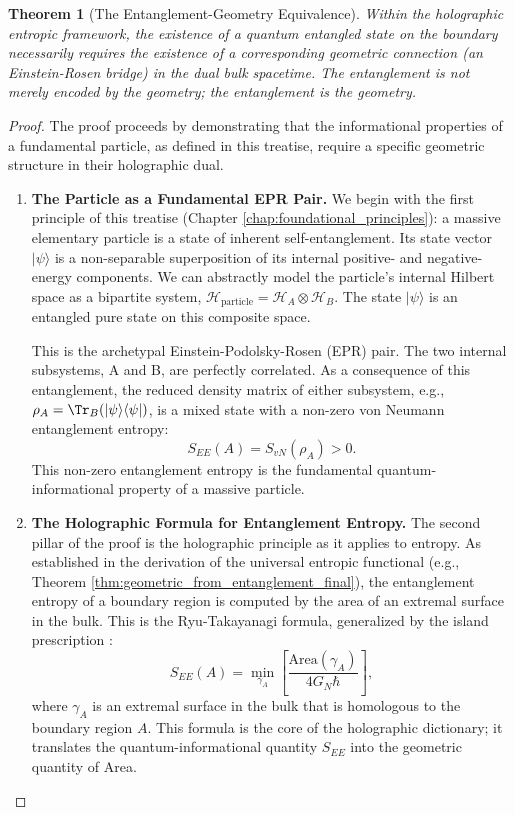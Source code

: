 \documentclass[11pt, letterpaper]{report}
\theoremstyle{plain} %
\newtheorem{theorem}{Theorem}[chapter]
\theoremstyle{definition} %
\theoremstyle{remark} %
\begin{document}
\begin{theorem}[The Entanglement-Geometry Equivalence]
\label{thm:er_epr_proof}
Within the holographic entropic framework, the existence of a quantum entangled state on the boundary necessarily requires the existence of a corresponding geometric connection (an Einstein-Rosen bridge) in the dual bulk spacetime. The entanglement is not merely encoded by the geometry; the entanglement \textit{is} the geometry.
\end{theorem}
\begin{proof}
The proof proceeds by demonstrating that the informational properties of a fundamental particle, as defined in this treatise, require a specific geometric structure in their holographic dual.

\begin{enumerate}
    \item \textbf{The Particle as a Fundamental EPR Pair.}
    We begin with the first principle of this treatise (Chapter \ref{chap:foundational_principles}): a massive elementary particle is a state of inherent self-entanglement. Its state vector $|\psi\rangle$ is a non-separable superposition of its internal positive- and negative-energy components. We can abstractly model the particle's internal Hilbert space as a bipartite system, $\mathcal{H}_{\text{particle}} = \mathcal{H}_A \otimes \mathcal{H}_B$. The state $|\psi\rangle$ is an entangled pure state on this composite space.
    
    This is the archetypal Einstein-Podolsky-Rosen (EPR) pair. The two internal subsystems, A and B, are perfectly correlated. As a consequence of this entanglement, the reduced density matrix of either subsystem, e.g., $\rho_A = \Tr_B(|\psi\rangle\langle\psi|)$, is a mixed state with a non-zero von Neumann entanglement entropy:
    \begin{equation}
        S_{EE}(A) = S_{vN}(\rho_A) > 0.
    \end{equation}
    This non-zero entanglement entropy is the fundamental quantum-informational property of a massive particle.

    \item \textbf{The Holographic Formula for Entanglement Entropy.}
    The second pillar of the proof is the holographic principle as it applies to entropy. As established in the derivation of the universal entropic functional (e.g., Theorem \ref{thm:geometric_from_entanglement_final}), the entanglement entropy of a boundary region is computed by the area of an extremal surface in the bulk. This is the Ryu-Takayanagi formula, generalized by the island prescription \cite{Ryu2006Holographic,Almheiri2019Islands}:
    \begin{equation}
        S_{EE}(A) = \min_{\gamma_A} \left[ \frac{\text{Area}(\gamma_A)}{4 G_N \hbar} \right],
    \end{equation}
    where $\gamma_A$ is an extremal surface in the bulk that is homologous to the boundary region $A$. This formula is the core of the holographic dictionary; it translates the quantum-informational quantity $S_{EE}$ into the geometric quantity of Area.


\end{enumerate}
\end{proof}
\end{document}
